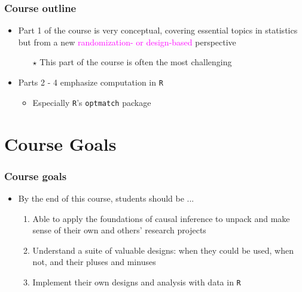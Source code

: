\documentclass[table, xcolor = {dvipsnames}, 9pt]{beamer}
\theoremstyle{plain}
\begin{document}
\begin{frame}[t]
\frametitle{Course outline}
\vfill
\begin{itemize} \vfill
\item Part 1 of the course is very conceptual, covering essential topics in statistics but from a new \textcolor{magenta}{randomization- or design-based} perspective \vfill
\begin{itemize} \vfill
\item[$\star$] This part of the course is often the most challenging \vfill
\end{itemize} \vfill
\item Parts 2 - 4 emphasize computation in \texttt{R} \vfill
\begin{itemize} \vfill
\item Especially \texttt{R}'s \texttt{optmatch} package \vfill
\end{itemize} \vfill
\end{itemize} \vfill
\vfill
\end{frame}
\section{Course Goals}
\begin{frame}[t]
\frametitle{Course goals}
\vfill
\begin{itemize} \vfill
\item By the end of this course, students should be ...
\begin{enumerate} \vfill
\item Able to apply the foundations of causal inference to unpack and make sense of their own and others' research projects \vfill
\item Understand a suite of valuable designs: when they could be used, when not, and their pluses and minuses \vfill
\item Implement their own designs and analysis with data in \texttt{R} \vfill
\end{enumerate} \vfill
\end{itemize} \vfill
\vfill
\end{frame}
\end{document}
